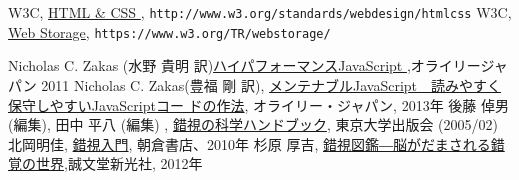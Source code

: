 \begin{thebibliography}{99}
 W3C,
				 \href{http://www.w3.org/standards/webdesign/htmlcss}
				 {HTML \& CSS
         }, \texttt{http://www.w3.org/standards/webdesign/htmlcss}
 W3C, \href{https://www.w3.org/TR/webstorage/}
				 {Web Storage}, \texttt{https://www.w3.org/TR/webstorage/}
\iffalse
 \bibitem{WebSecurity}Christopher Wells (牧野 聡  訳)
\href{http://www.amazon.co.jp/Ajaxアプリケーション-Webセキュリティ-Christopher-Wells/dp/487311358X/ref=sr_1_2?ie=UTF8&s=books&qid=1208068747&sr=8-2}
	 {Ajax アプリケーション\&Webセキュリティ}, オライリージャパン, 2008
\fi
 Nicholas C. Zakas (水野 貴明 訳)\href{http://www.amazon.co.jp/%E3%83%8F%E3%82%A4%E3%83%91%E3%83%95%E3%82%A9%E3%83%BC%E3%83%9E%E3%83%B3%E3%82%B9JavaScript-Nicholas-C-Zakas/dp/487311490X/ref=sr_1_1?ie=UTF8&s=books&qid=1304649839&sr=8-1}{ハイパフォーマンスJavaScript },オライリージャパン 2011
Nicholas C. Zakas(豊福 剛 訳), 
\href{http://www.amazon.co.jp/%E3%83%A1%E3%83%B3%E3%83%86%E3%83%8A%E3%83%96%E3%83%ABJavaScript-%E2%80%95%E8%AA%AD%E3%81%BF%E3%82%84%E3%81%99%E3%81%8F%E4%BF%9D%E5%AE%88%E3%81%97%E3%82%84%E3%81%99%E3%81%84JavaScript%E3%82%B3%E3%83%BC%E3%83%89%E3%81%AE%E3%81%9F%E3%82%81%E3%81%AE%E4%BD%9C%E6%B3%95-Nicholas-C-Zakas/dp/4873116104/ref=sr_1_1?ie=UTF8&qid=1365330242&sr=8-1&keywords=%E3%83%A1%E3%83%B3%E3%83%86%E3%83%8A%E3%83%96%E3%83%ABJavaScript%E3%80%80}
{メンテナブルJavaScript　読みやすく保守しやすいJavaScriptコー
ドの作法}, オライリー・ジャパン, 2013年
後藤 倬男 (編集), 田中 平八 (編集) , \href{http://www.amazon.co.jp/%E9%8C%AF%E8%A6%96%E3%81%AE%E7%A7%91%E5%AD%A6%E3%83%8F%E3%83%B3%E3%83%89%E3%83%96%E3%83%83%E3%82%AF-%E5%BE%8C%E8%97%A4-%E5%80%AC%E7%94%B7/dp/4130111159/sr=1-3/qid=1167376185/ref=sr_1_3/503-0729601-8062303?ie=UTF8&s=books}
{錯視の科学ハンドブック}, 東京大学出版会 (2005/02)
北岡明佳, 
				\href{http://www.amazon.co.jp/%E9%8C%AF%E8%A6%96%E5%85%A5%E9%96%80-%E5%8C%97%E5%B2%A1-%E6%98%8E%E4%BD%B3/dp/4254102267/ref=sr_1_2?s=books&ie=UTF8&qid=1457334952&sr=1-2&keywords=%E5%8C%97%E5%B2%A1%E6%98%8E%E4%BD%B3}
				{錯視入門}, 朝倉書店、2010年
杉原 厚吉,
				\href{http://www.amazon.co.jp/%E9%8C%AF%E8%A6%96%E5%9B%B3%E9%91%91%E2%80%95%E8%84%B3%E3%81%8C%E3%81%A0%E3%81%BE%E3%81%95%E3%82%8C%E3%82%8B%E9%8C%AF%E8%A6%9A%E3%81%AE%E4%B8%96%E7%95%8C-%E6%9D%89%E5%8E%9F-%E5%8E%9A%E5%90%89/dp/4416212658/ref=sr_1_4?s=books&ie=UTF8&qid=1457335216&sr=1-4&keywords=%E9%8C%AF%E8%A6%96}{錯視図鑑―脳がだまされる錯覚の世界},誠文堂新光社, 2012年


\end{thebibliography}
